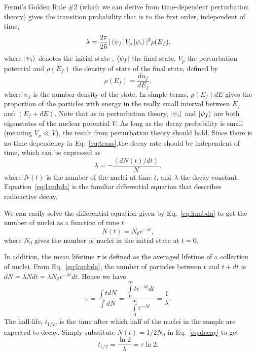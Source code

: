\documentclass[nofootinbib,preprint,aps]{revtex4-1}
\begin{document}
        Fermi's Golden Rule \#2 (which we can derive from time-dependent
        perturbation theory)
        gives the transition probability that is to the first order, independent of time,
        \begin{equation}
            \label{eq:trans}
            \lambda = \frac{2\pi}{2\hbar}|\bra{\psi_f}V_p\ket{\psi_i}|^2\rho(E_f),
        \end{equation}
        where $\ket{\psi_i}$ denotes the initial state , $\bra{\psi_f}$ the final state, $V_p$ the perturbation
        potential and $\rho(E_f)$ the density of state of the final state, defined by
        \begin{equation}
            \rho(E_f) = \frac{dn_f}{dE_f},
        \end{equation}
        where $n_f$ is the number density of the state. \cite[chapt. 6]{k88}
        In simple terms, $\rho(E_f)dE$ gives the proportion of the particles with energy in the
        really small interval between
        $E_f$ and $(E_f+dE)$.
        Note that as in perturbation theory, $\ket{\psi_i}$ and
        $\ket{\psi_f}$ are both eigenstates of the nuclear potential $V$. As long as
        the decay probability is small (meaning $V_p\ll V$), the result from perturbation theory should hold. Since
        there is no time dependency in Eq.~\ref{eq:trans},the
        decay rate should be independent of time, which can be expressed as
        \begin{equation}
            \label{eq:lambda}
            \lambda = -\frac{(dN(t)/dt)}{N},
        \end{equation}
        where $N(t)$ is the number of the nuclei at time $t$, and $\lambda$ the decay constant.
        Equation~\ref{eq:lambda} is the familiar differential equation that describes radioactive decay.
        
        We can easily solve the differential equation given by Eq.~\ref{eq:lambda} to get
        the number of nuclei as a function of time $t$
        \begin{equation}
            \label{eq:decay}
            N(t) = N_0 e^{-\lambda t},
        \end{equation}
        where $N_0$ gives the number of nuclei in the initial state at $t=0$.

        In addition, the mean lifetime $\tau$ is defined as the averaged lifetime of a collection of nuclei.
        From Eq.~\ref{eq:lambda}, the number of particles between $t$ and $t+dt$ is $dN=\lambda N dt=\lambda
        N_0 e^{-\lambda t}dt$. Hence we have
        \begin{equation}
            \tau = \frac{\int t dN}{\int dN}=\frac{\int\limits_0^{\infty}t e^{-\lambda t}dt}
            {\int\limits_0^{\infty}e^{-\lambda t}} = \frac{1}{\lambda}.
        \end{equation}
        The half-life, $t_{1/2}$, is the time after which half of the nuclei in the sample are expected to
        decay. Simply substitute $N(t)=1/2N_0$ in Eq.~\ref{eq:decay} to get
        \begin{equation}
            t_{1/2} = \frac{\ln 2}{\lambda}=\tau \ln 2.
        \end{equation}
\end{document}
